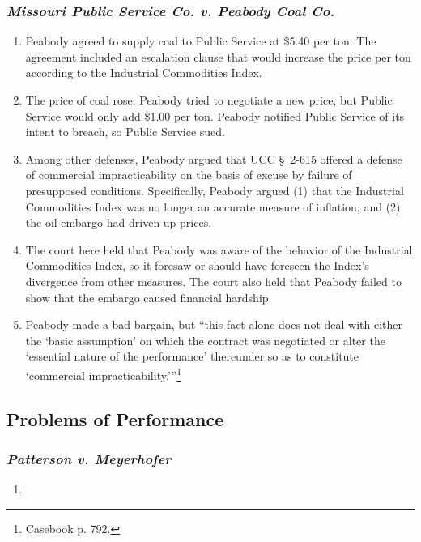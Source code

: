 \subsubsection{\emph{Missouri Public Service Co. v. Peabody Coal Co.}}

\begin{enumerate}
    \item Peabody agreed to supply coal to Public Service at \$5.40 per ton. 
    The agreement included an escalation clause that would increase the price 
    per ton according to the Industrial Commodities Index.
    \item The price of coal rose. Peabody tried to negotiate a new price, but 
    Public Service would only add \$1.00 per ton. Peabody notified Public 
    Service of its intent to breach, so Public Service sued.
    \item Among other defenses, Peabody argued that UCC \S\ 2-615 offered a 
    defense of commercial impracticability on the basis of excuse by failure 
    of presupposed conditions. Specifically, Peabody argued (1) that the 
    Industrial Commodities Index was no longer an accurate measure of 
    inflation, and (2) the oil embargo had driven up prices.
    \item The court here held that Peabody was aware of the behavior of the 
    Industrial Commodities Index, so it foresaw or should have foreseen the 
    Index's divergence from other measures. The court also held that Peabody 
    failed to show that the embargo caused financial hardship.
    \item Peabody made a bad bargain, but \enquote{this fact alone does not 
    deal with either the `basic assumption' on which the contract was 
    negotiated or alter the `essential nature of the performance' thereunder 
    so as to constitute `commercial impracticability.'}\footnote{Casebook p. 
    792.}
\end{enumerate}

\subsection{Problems of Performance}

\subsubsection{\emph{Patterson v. Meyerhofer}}

\begin{enumerate}
    \item %
\end{enumerate}

